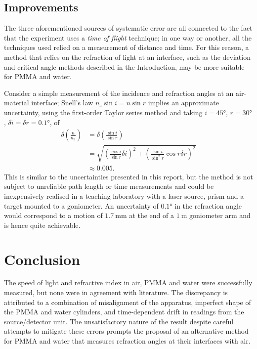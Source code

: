 \documentclass[
    aps,
    prl,
    reprint,
    10pt,
    amsmath,
    amssymb,
    a4paper,
    longbibliography
]{revtex4-2}
\begin{document}
\subsection{Improvements}
The three aforementioned sources of systematic error are all connected
to the fact that the experiment uses a \emph{time of flight} technique;
in one way or another, all the techniques used relied on a measurement
of distance and time. For this reason, a method that relies on the
refraction of light at an interface, such as the deviation and critical
angle methods described in the Introduction, may be more suitable
for PMMA and water.

Consider a simple measurement of the incidence
and refraction angles at an air-material interface; Snell's law
$n_\mathrm{a}\sin{i} = n\sin{r}$ implies an approximate uncertainty,
using the first-order Taylor series method and taking
$i = \ang{45}$, $r = \ang{30}$, $\delta i = \delta r = \ang{0.1}$, of
\begin{align*}
    \delta \left( \frac{n}{n_\mathrm{a}} \right)
    &= \delta \left( \frac{\sin{i}}{\sin{r}} \right) \\
    &= \sqrt{
        \left( \frac{\cos{i}}{\sin{r}} \delta i \right)^2
        + \left( \frac{\sin{i}}{\sin^2{r}} \cos{r} \delta r \right)^2
    } \\
    &\approx 0.005.
\end{align*}
This is similar to the uncertainties presented in this report, but the
method is not subject to unreliable path length or time measurements
and could be inexpensively realised in a teaching laboratory with
a laser source, prism and a target mounted to a goniometer. An
uncertainty of $\ang{0.1}$ in the refraction angle would correspond to
a motion of $\SI{1.7}{\milli\meter}$ at the end of a $\SI{1}{\meter}$
goniometer arm and is hence quite achievable.


\section{Conclusion}

The speed of light and refractive index in air, PMMA and water
were successfully measured, but none were in agreement with literature. The
discrepancy is attributed to a combination of misalignment of the
apparatus, imperfect shape of the PMMA and water cylinders, and
time-dependent drift in readings from the source/detector unit.
The unsatisfactory nature of the result despite careful attempts to
mitigate these errors prompts the proposal of an alternative method
for PMMA and water that measures refraction angles at their interfaces
with air.
\end{document}
